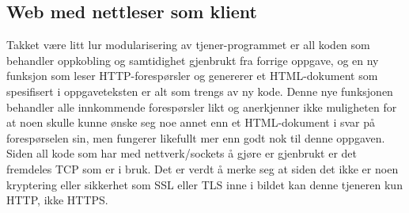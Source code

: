 \documentclass{article}
\begin{document}
\subsection{Web med nettleser som klient}

Takket være litt lur modularisering av tjener-programmet er all koden som behandler oppkobling og samtidighet gjenbrukt fra forrige oppgave, og en ny funksjon som leser HTTP-forespørsler og genererer et HTML-dokument som spesifisert i oppgaveteksten er alt som trengs av ny kode. Denne nye funksjonen behandler alle innkommende forespørsler likt og anerkjenner ikke muligheten for at noen skulle kunne ønske seg noe annet enn et HTML-dokument i svar på forespørselen sin, men fungerer likefullt mer enn godt nok til denne oppgaven. Siden all kode som har med nettverk/sockets å gjøre er gjenbrukt er det fremdeles TCP som er i bruk. Det er verdt å merke seg at siden det ikke er noen kryptering eller sikkerhet som SSL eller TLS inne i bildet kan denne tjeneren kun HTTP, ikke HTTPS.
\end{document}
